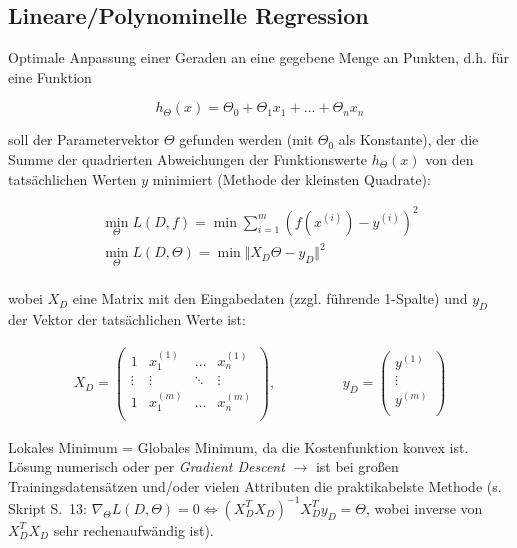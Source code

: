 \subsection{Lineare/Polynominelle Regression}
\label{linearRegression}
Optimale Anpassung einer Geraden an eine gegebene Menge an Punkten, d.h. für eine Funktion

\begin{equation*}
    h_{\Theta}(x) = \Theta_0 + \Theta_1x_1 + \dots + \Theta_nx_n
\end{equation*}

soll der Parametervektor $\Theta$ gefunden werden (mit $\Theta_0$ als Konstante), der die Summe der quadrierten Abweichungen der Funktionswerte $h_{\Theta}(x)$ von den tatsächlichen Werten $y$ minimiert (Methode der kleinsten Quadrate):

\begin{equation*}
    \begin{split}
        \underset{\Theta}{\min} L(D, f) = \min \sum_{i=1}^{m}(f(x^{(i)}) - y^{(i)})^2\\
        \underset{\Theta}{\min} L(D, \Theta) = \min \Vert X_D\Theta-y_D\Vert^2\\
    \end{split}
\end{equation*}

wobei $X_D$ eine Matrix mit den Eingabedaten (zzgl. führende 1-Spalte) und $y_D$ der Vektor der tatsächlichen Werte ist:

\begin{equation*}
    \begin{split}
        X_D=
        \begin{pmatrix}
            1 & x_1^{(1)} & \dots & x_n^{(1)}\\
            \vdots & \vdots & \ddots & \vdots\\
            1 & x_1^{(m)} & \dots & x_n^{(m)}\\
        \end{pmatrix},\hspace{2cm}
        y_D=
        \begin{pmatrix}
            y^{(1)}\\
            \vdots\\
            y^{(m)}\\
        \end{pmatrix}
    \end{split}
\end{equation*}

Lokales Minimum = Globales Minimum, da die Kostenfunktion konvex ist. Lösung numerisch oder per \emph{Gradient Descent} $\rightarrow$ ist bei großen Trainingsdatensätzen und/oder vielen Attributen die praktikabelste Methode (s. Skript S.~13: $\nabla_\Theta L(D,\Theta)=0 \Leftrightarrow (X_D^TX_D)^{-1}X_D^Ty_D=\Theta$, wobei inverse von $X_D^TX_D$ sehr rechenaufwändig ist).\\

